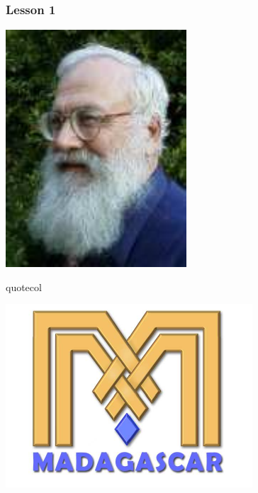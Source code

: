\begin{frame}
  \MadLogo
  \frametitle{Lesson 1}
{\flushright
  \includegraphics[height=0.2\textheight]{Fig/Claerbout}
  } 
\vfill
\begin{beamercolorbox}[wd=\textwidth,center]{quotecol}
\Large {}
\end{beamercolorbox}
\vfill

\end{frame}

\begin{frame}
  \begin{center}
 \includegraphics[height=0.5\textheight]{Fig/MadLogo} \\
 {} \\
 {} 
  \end{center}
\end{frame}

